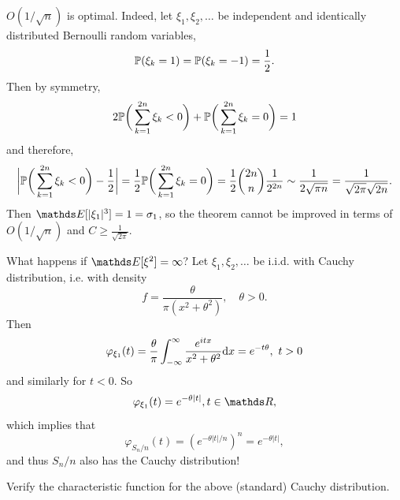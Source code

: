 \begin{remark}
$O(1/\sqrt{n})$ is optimal. Indeed, let $\xi_1, \xi_2, \dots$ be independent and identically distributed Bernoulli random variables, 
\begin{equation*}
    \mathbb{P}(\xi_k = 1) = \mathbb{P}(\xi_k = -1) = \frac12.
\end{equation*}
Then by symmetry,
\begin{equation*}
    2\mathbb{P}\bigg(\sum_{k=1}^{2n} \xi_k < 0\bigg) + \mathbb{P}\bigg(\sum_{k=1}^{2n} \xi_k = 0\bigg) = 1
\end{equation*}
and therefore,
\begin{equation*}
    \bigg|\mathbb{P}\bigg(\sum_{k=1}^{2n} \xi_k < 0\bigg) - \frac12 \bigg| = \frac12 \mathbb{P}\bigg(\sum_{k=1}^{2n} \xi_k = 0\bigg) = \frac12 \binom{2n}{n} \frac{1}{2^{2n}} \sim \frac{1}{2\sqrt{\pi n}} = \frac{1}{\sqrt{2\pi}\sqrt{2n}}.
\end{equation*}
Then $\E[|\xi_1|^3] = 1 = \sigma_1$, so the theorem cannot be improved in terms of $O(1/\sqrt{n})$ and $C \ge \frac{1}{\sqrt{2\pi}}$.
\end{remark}

\begin{example}
What happens if $\E[\xi^2] = \infty$? Let $\xi_1, \xi_2, \dots$ be i.i.d. with Cauchy distribution, i.e. with density
\begin{equation*}
    f = \frac{\theta}{\pi(x^2 + \theta^2)}, \quad \theta>0.
\end{equation*}
Then 
\begin{equation*}
    \varphi_{\xi_1}(t) = \frac{\theta}{\pi} \int_{-\infty}^\infty  \frac{e^{itx}}{x^2 + \theta^2}\mathrm{d} x = e^{-t\theta}, \, \,t>0
\end{equation*}
and similarly for $t < 0$. So
\begin{equation*}
    \varphi_{\xi_1}(t) = e^{-\theta |t|}, t \in \R,
\end{equation*}
which implies that 
\begin{equation*}
    \varphi_{S_n/n} (t) = (e^{-\theta|t|/n})^n = e^{-\theta|t|},
\end{equation*}
and thus $S_n/n$ also has the Cauchy distribution!
\end{example}

\begin{exercise}
Verify the characteristic function for the above (standard) Cauchy distribution.
\end{exercise}

